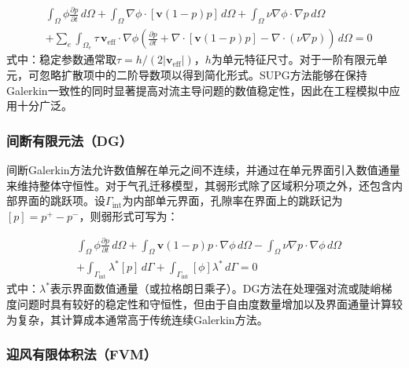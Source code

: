 \begin{equation}
	\begin{aligned}
		&
		\int_\Omega
		\phi
		\frac{\partial p}{\partial t}
		\,d\Omega
		+
		\int_\Omega
		\nabla\phi\cdot[\mathbf v(1-p)p]
		\,d\Omega
		+
		\int_\Omega
		\nu\nabla\phi\cdot\nabla p
		\,d\Omega
		\\
		&
		+
		\sum_e
		\int_{\Omega_e}
		\tau\,\mathbf v_{\mathrm{eff}}\cdot\nabla\phi
		\left(
		\frac{\partial p}{\partial t}
		+
		\nabla\cdot[\mathbf v(1-p)p]
		-
		\nabla\cdot(\nu\nabla p)
		\right)
		\,d\Omega
		=0 
	\end{aligned}
	\label{eq:supg_weak}
\end{equation}
\noindent 式中：稳定参数通常取$\tau=h/(2|\mathbf v_{\mathrm{eff}}|)$，$h$为单元特征尺寸。对于一阶有限元单元，可忽略扩散项中的二阶导数项以得到简化形式。SUPG方法能够在保持Galerkin一致性的同时显著提高对流主导问题的数值稳定性，因此在工程模拟中应用十分广泛。

\subsubsection{间断有限元法（DG）}

间断Galerkin方法允许数值解在单元之间不连续，并通过在单元界面引入数值通量来维持整体守恒性\cite{shuonanStabilizedFiniteElement2024}。对于气孔迁移模型，其弱形式除了区域积分项之外，还包含内部界面的跳跃项。设$\Gamma_{\mathrm{int}}$为内部单元界面，孔隙率在界面上的跳跃记为$[p]=p^+-p^-$，则弱形式可写为：

\begin{equation}
	\begin{aligned}
		&
		\int_\Omega
		\phi
		\frac{\partial p}{\partial t}
		\,d\Omega
		+
		\int_\Omega
		\mathbf v(1-p)p\cdot\nabla\phi
		\,d\Omega
		-
		\int_\Omega
		\nu\nabla p\cdot\nabla\phi
		\,d\Omega
		\\
		&
		+
		\int_{\Gamma_{\mathrm{int}}}
		\lambda^*[p]\,d\Gamma
		+
		\int_{\Gamma_{\mathrm{int}}}
		[\phi]\lambda^*\,d\Gamma
		=0 
	\end{aligned}
	\label{eq:dg_weak}
\end{equation}
\noindent 式中：$\lambda^*$表示界面数值通量（或拉格朗日乘子）。DG方法在处理强对流或陡峭梯度问题时具有较好的稳定性和守恒性，但由于自由度数量增加以及界面通量计算较为复杂，其计算成本通常高于传统连续Galerkin方法。

\subsubsection{迎风有限体积法（FVM）}

